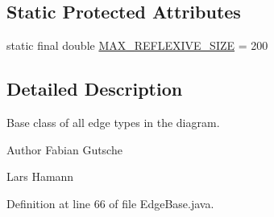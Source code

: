 \subsection*{Static Protected Attributes}
\begin{DoxyCompactItemize}
\item 
static final double \hyperlink{classorg_1_1tzi_1_1use_1_1gui_1_1views_1_1diagrams_1_1elements_1_1edges_1_1_edge_base_a4775f6afdf072ebdda906b123787f351}{M\-A\-X\-\_\-\-R\-E\-F\-L\-E\-X\-I\-V\-E\-\_\-\-S\-I\-Z\-E} = 200
\end{DoxyCompactItemize}


\subsection{Detailed Description}
Base class of all edge types in the diagram.

\begin{DoxyAuthor}{Author}
Fabian Gutsche 

Lars Hamann 
\end{DoxyAuthor}


Definition at line 66 of file Edge\-Base.\-java.



